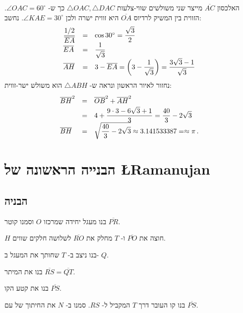 האלכסון
$\overline{AC}$
מייצר שני משולשים שווי-צלעות
$\triangle OAC, \triangle DAC$
כך ש-%
$\angle OAC=60^\circ$.
הזווית בין המשיק לרדיוס
$\overline{OA}$
היא זווית ישרה ולכן
$\angle KAE=30^\circ$.
נחשב:
\begin{displaymath}
\renewcommand{\arraystretch}{1.5}
\begin{array}{lcl}
\disfrac{1/2}{\overline{EA}}&=&
\cos 30^\circ=\disfrac{\sqrt{3}}{2}\\
\overline{EA}&=&\disfrac{1}{\sqrt{3}}\\
\overline{AH}&=&3-\overline{EA}=\left(3-\disfrac{1}{\sqrt{3}}\right)
=\disfrac{3\sqrt{3}-1}{\sqrt{3}}\\
\end{array}
\end{displaymath}
נחזור לאיור הראשון ונראה ש-%
$\triangle ABH$
הוא משולש ישר-זווית:
\begin{displaymath}
\renewcommand{\arraystretch}{1.5}
\begin{array}{lcl}
\overline{BH}^2&=&\overline{OB}^2+\overline{AH}^2\\
&=&4+\disfrac{9\cdot 3 -6\sqrt{3}+1}{3}=\disfrac{40}{3}-2\sqrt{3}\\
\overline{BH}&=&\sqrt{\disfrac{40}{3}-2\sqrt{3}}\approx 3.141533387=\approx \pi\,.
\end{array}
\end{displaymath}



\vspace*{-16ex}

\section{הבנייה הראשונה של
\L{Ramanujan}}


\subsection{הבניה}

בנו מעגל יחידה שמרכזו 
$O$
וסמנו קוטר
$\overline{PR}$.

$H$
חוצה את
$\overline{PO}$
ו-%
$T$
מחלק את
$\overline{RO}$
לשלושה חלקים שווים.

בנו ניצב ב-%
$T$
שחותך את המעגל ב-%
$Q$.

בנו את המיתר
$\overline{RS}=\overline{QT}$.

בנו את קטע הקו
$\overline{PS}$.

בנו קו העובר דרך
$T$
המקביל ל-%
$RS$.
סמנו ב-%
$N$
את החיתוך של עם 
$\overline{PS}$.

